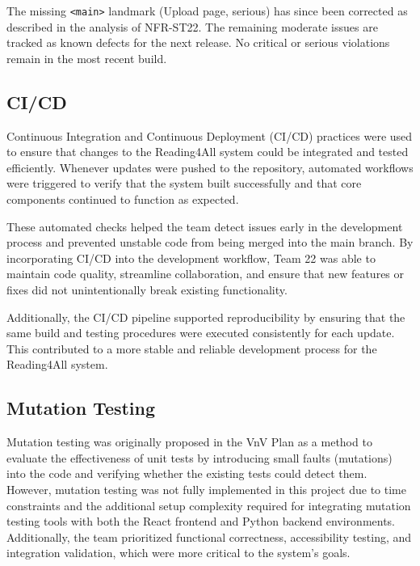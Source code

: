 \documentclass[12pt, titlepage]{article}
\begin{document}
\noindent The missing \texttt{<main>} landmark (Upload page, serious) has since been corrected as described in the analysis of NFR-ST22. The remaining moderate issues are tracked as known defects for the next release. No critical or serious violations remain in the most recent build.

\subsection{CI/CD}

Continuous Integration and Continuous Deployment (CI/CD) practices
were used to ensure that changes to the Reading4All system could be
integrated and tested efficiently. Whenever updates were pushed to
the repository, automated workflows were triggered to verify that the
system built successfully and that core components continued to
function as expected.

These automated checks helped the team detect issues early in the
development process and prevented unstable code from being merged
into the main branch. By incorporating CI/CD into the development
workflow, Team 22 was able to maintain code quality, streamline
collaboration, and ensure that new features or fixes did not
unintentionally break existing functionality.

Additionally, the CI/CD pipeline supported reproducibility by
ensuring that the same build and testing procedures were executed
consistently for each update. This contributed to a more stable and
reliable development process for the Reading4All system.

\subsection{Mutation Testing}
Mutation testing was originally proposed in the VnV Plan as a method
to evaluate the effectiveness of unit tests by introducing small
faults (mutations) into the code and verifying whether the existing
tests could detect them. \\

However, mutation testing was not fully implemented in this project
due to time constraints and the additional setup complexity required
for integrating mutation testing tools with both the React frontend
and Python backend environments.
Additionally, the team prioritized functional correctness,
accessibility testing, and integration validation, which were more
critical to the system’s goals. \\
\end{document}
